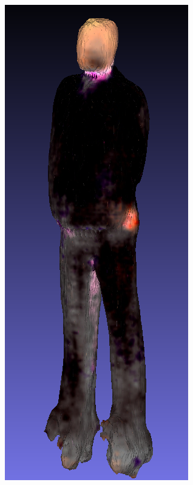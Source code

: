 \begin{figure}[ht]
    \centering
    \small
    \begin{subfigure}[b]{0.108\textwidth}
        \centering
        \includegraphics[width=\textwidth]{figures/appendix/bias_rich_dreamfusion.png}

\end{subfigure}
\end{figure}
